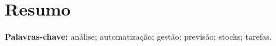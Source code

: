 \cleardoublepage\newpage
\chapter*{Resumo} \label{resumo}



\vspace{0.2cm}
{\bf Palavras-chave:} análise; automatização; gestão; previsão; stocks; tarefas.